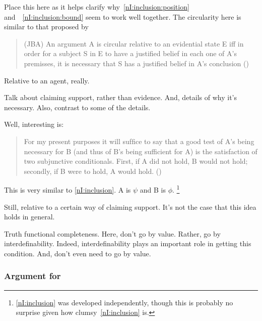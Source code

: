 \begin{note}[Literature]
  {
    \color{red}
    Place this here as it helps clarify why~\ref{nI:inclusion:position} and~~\ref{nI:inclusion:bound} seem to work well together.
  }
  The circularity here is similar to that proposed by~\cite{Sgaravatti:2013wu}

  \begin{quote}
    (JBA) An argument A is circular relative to an evidential state E iff in order for a subject S in E to have a justiﬁed belief in each one of A’s premisses, it is necessary that S has a justiﬁed belief in A’s conclusion\nolinebreak
    \mbox{}\hfill\mbox{(\Citeyear[759]{Sgaravatti:2013wu})}
  \end{quote}
  Relative to an agent, really.

  Talk about claiming support, rather than evidence.
  And, details of why it's necessary.
  Also, contrast to some of the details.

  Well, interesting is:
  \begin{quote}
    For my present purposes it will sufﬁce to say that a good test of A’s being necessary for B (and thus of B’s being sufficient for A) is the satisfaction of two subjunctive conditionals. First, if A did not hold, B would not hold; secondly, if B were to hold, A would hold.\nolinebreak
    \mbox{}\hfill\mbox{(\Citeyear[761]{Sgaravatti:2013wu})}
  \end{quote}
  This is very similar to \ref{nI:inclusion}.
  A is \(\psi\) and B is \(\phi\).\nolinebreak
  \footnote{
    \ref{nI:inclusion} was developed independently, though this is probably no surprise given how clumsy~\ref{nI:inclusion} is.
  }

  Still, relative to a certain way of claiming support.
  It's not the case that this idea holds in general.
\end{note}

\begin{note}
  \color{red}
  Truth functional completeness.
  Here, don't go by value.
  Rather, go by interdefinability.
  Indeed, interdefinability plays an important role in getting this condition.
  And, don't even need to go by value.
\end{note}



\newpage

\subsubsection{Argument for \nI{}}
\label{sec:argument-ni-1}

